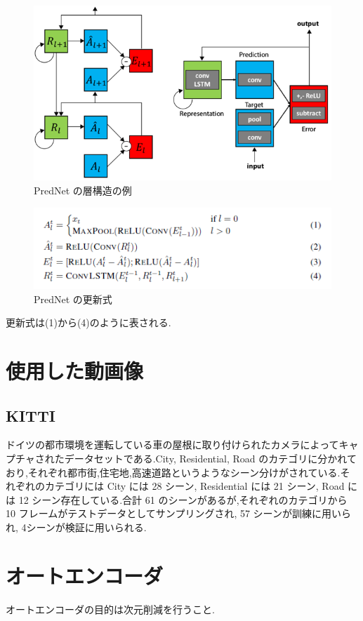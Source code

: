  \begin{figure}[hb]
\includegraphics[scale=0.4]{prednet.png}
 \caption{PredNet の層構造の例}
\end{figure}
\begin{figure}[hb]
\includegraphics[scale=0.4]{DeepPrednet_formula.png}
 \caption{PredNet の更新式}
\end{figure}
更新式は(1)から(4)のように表される.

\section{使用した動画像}
\subsection{KITTI}
ドイツの都市環境を運転している車の屋根に取り付けられたカメラによってキャプチャされたデータセットである.City, Residential, Road のカテゴリに分かれており,それぞれ都市街,住宅地,高速道路というようなシーン分けがされている.それぞれのカテゴリには City には 28 シーン, Residential には 21 シーン, Road には 12 シーン存在している.合計 61 のシーンがあるが,それぞれのカテゴリから 10 フレームがテストデータとしてサンプリングされ, 57 シーンが訓練に用いられ, 4シーンが検証に用いられる.

\section{オートエンコーダ}
オートエンコーダの目的は次元削減を行うこと.
